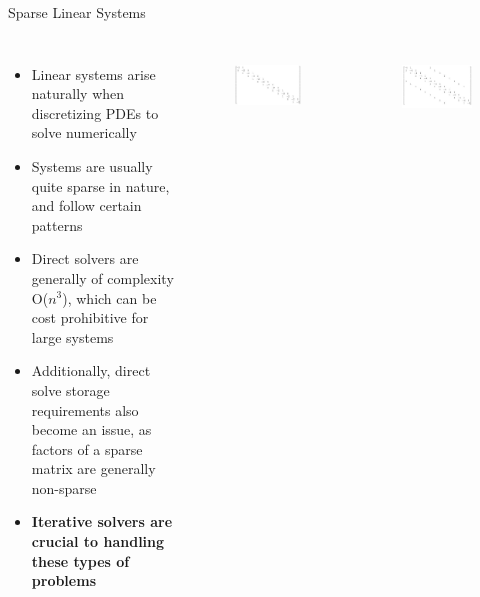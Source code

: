 \documentclass[10pt]{beamer}
\begin{document}
\begin{frame}{Sparse Linear Systems}
	
	\begin{columns}
		\begin{itemize}
			\item Linear systems arise naturally when discretizing PDEs to solve numerically	
			
			\item Systems are usually quite sparse in nature, and follow certain patterns
			
			\item Direct solvers are generally of complexity O($n^{3}$), which can be cost prohibitive for large systems
			
			\item Additionally, direct solve storage requirements also become an issue, as factors of a sparse matrix are generally non-sparse
			\pause
			
			\item \textbf{Iterative solvers are crucial to handling these types of problems}
			
		\end{itemize}
			\begin{figure}[H]
			\centering
			\includegraphics[scale=0.60]{case1.jpg}
			\label{fig:case1} 
		\end{figure}
		\begin{figure}[H]
			\centering
			\includegraphics[scale=0.60]{case2.jpg}
			\label{fig:case2} 
		\end{figure}
		
	\end{columns}	
\end{frame}
\end{document}
